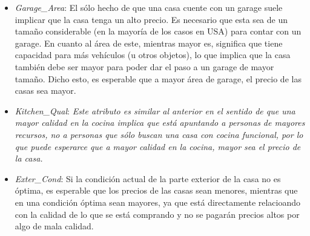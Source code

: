 \documentclass[
]{article}
\begin{document}
\begin{itemize}
\item
  \emph{Garage\_Area}: El sólo hecho de que una casa cuente con un
  garage suele implicar que la casa tenga un alto precio. Es necesario
  que esta sea de un tamaño considerable (en la mayoría de los casos en
  USA) para contar con un garage. En cuanto al área de este, mientras
  mayor es, significa que tiene capacidad para más vehículos (u otros
  objetos), lo que implica que la casa también debe ser mayor para poder
  dar el paso a un garage de mayor tamaño. Dicho esto, es esperable que
  a mayor área de garage, el precio de las casas sea mayor.
\item
  \emph{Kitchen\_Qual}: \emph{Este atributo es similar al anterior en el
  sentido de que una mayor calidad en la cocina implica que está
  apuntando a personas de mayores recursos, no a personas que sólo
  buscan una casa con cocina funcional, por lo que puede esperarce que a
  mayor calidad en la cocina, mayor sea el precio de la casa.}
\item
  \emph{Exter\_Cond}: Si la condición actual de la parte exterior de la
  casa no es óptima, es esperable que los precios de las casas sean
  menores, mientras que en una condición óptima sean mayores, ya que
  está directamente relacioando con la calidad de lo que se está
  comprando y no se pagarán precios altos por algo de mala calidad.
\end{itemize}
\end{document}
